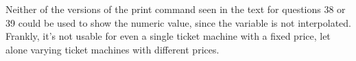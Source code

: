 Neither of the versions of the print command seen in the text for
questions 38 or 39 could be used to show the numeric value, since the
variable is not interpolated. Frankly, it's not usable for even a single
ticket machine with a fixed price, let alone varying ticket machines
with different prices.

